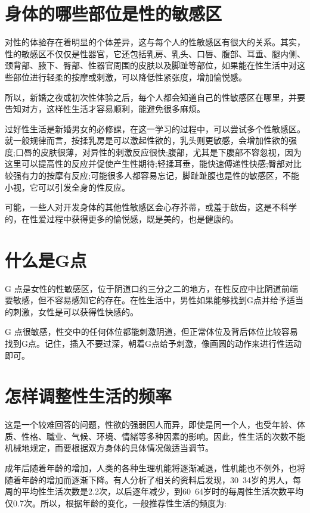 \documentclass[12pt,UTF8]{ctexbook}
\begin{document}
\section{身体的哪些部位是性的敏感区}

对性的体验存在着明显的个体差异，这与每个人的性敏感区有很大的关系。其实，性的敏感区不仅仅是性器官，它还包括乳房、乳头、口唇、腹部、耳垂、腿内侧、颈背部、腋下、臀部、性器官周围的皮肤以及脚趾等部位，如果能在性生活中对这些部位进行轻柔的按摩或刺激，可以降低性紧张度，增加愉悦感。

所以，新婚之夜或初次性体验之后，每个人都会知道自己的性敏感区在哪里，并要告知对方，这样性生活才容易顺利，能避免很多麻烦。

过好性生活是新婚男女的必修課，在这一学习的过程中，可以尝试多个性敏感区。就一般规律而言，按揉乳房是可以激起性欲的，乳头则更敏感，会增加性欲的强度;口唇的皮肤很薄，对异性的刺激反应很快;腹部，尤其是下腹部不容忽视，因为这里可以提高性的反应并促使产生性期待;轻揉耳垂，能快速傅递性快感;臀部对比较强有力的按摩有反应;可能很多人都容易忘记，脚趾趾腹也是性的敏感区，不能小视，它可以引发全身的性反应。

可能，一些人对开发身体的其他性敏感区会心存芥蒂，或羞于啟齿，这是不科学的，在性爱过程中获得更多的愉悦感，既是美的，也是健康的。

\section{什么是G点}

G 点是女性的性敏感区，位于阴道口约三分之二的地方，在性反应中比阴道前端要敏感，但不容易感知它的存在。在性生活中，男性如果能够找到G点并给予适当的刺激，女性是可以获得性快感的。

G 点很敏感，性交中的任何体位都能刺激阴道，但正常体位及背后体位比较容易找到G点。记住，插入不要过深，朝着G点给予刺激，像画圆的动作来进行性运动即可。

\section{怎样调整性生活的频率}

这是一个较难回答的问题，性欲的强弱因人而异，即使是同一个人，也受年龄、体质、性格、職业、气候、环境、情緒等多种因素的影响。因此，性生活的次数不能机械地规定，而要根据双方身体的具体情况做适当调节。

成年后随着年龄的增加，人类的各种生理机能将逐渐减退，性机能也不例外，也将随着年龄的增加而逐渐下降。有人分析了相关的资料后发现，30~34岁的男人，每周的平均性生活次数是2.2次，以后逐年减少，到60~64岁时的每周性生活次数平均仅0.7次。所以，根据年龄的变化，一般推荐性生活的频度为:
\end{document}
